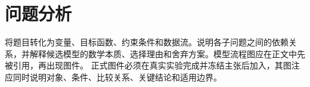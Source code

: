 \section{问题分析}
将题目转化为变量、目标函数、约束条件和数据流。说明各子问题之间的依赖关系，并解释候选模型的数学本质、选择理由和舍弃方案。模型流程图应在正文中先被引用，再出现图件。
正式图件必须在真实实验完成并冻结主张后加入，其图注应同时说明对象、条件、比较关系、关键结论和适用边界。
